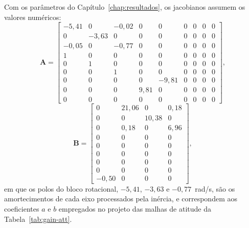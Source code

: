 {\color{blue}Com os parâmetros do Capítulo~\ref{chap:resultados}, os jacobianos assumem os valores numéricos:
\begin{equation}
    \mathbf{A} =
    \begin{bmatrix}
        -5{,}41 & 0 & -0{,}02 & 0 & 0 & 0 & 0 & 0 & 0 \\
        0 & -3{,}63 & 0 & 0 & 0 & 0 & 0 & 0 & 0 \\
        -0{,}05 & 0 & -0{,}77 & 0 & 0 & 0 & 0 & 0 & 0 \\
        1 & 0 & 0 & 0 & 0 & 0 & 0 & 0 & 0 \\
        0 & 1 & 0 & 0 & 0 & 0 & 0 & 0 & 0 \\
        0 & 0 & 1 & 0 & 0 & 0 & 0 & 0 & 0 \\
        0 & 0 & 0 & 0 & -9{,}81 & 0 & 0 & 0 & 0 \\
        0 & 0 & 0 & 9{,}81 & 0 & 0 & 0 & 0 & 0 \\
        0 & 0 & 0 & 0 & 0 & 0 & 0 & 0 & 0
    \end{bmatrix},
    \label{eq:matrix-A-num}
\end{equation}
\begin{equation}
    \mathbf{B} =
    \begin{bmatrix}
        0 & 21{,}06 & 0 & 0{,}18 \\
        0 & 0 & 10{,}38 & 0 \\
        0 & 0{,}18 & 0 & 6{,}96 \\
        0 & 0 & 0 & 0 \\
        0 & 0 & 0 & 0 \\
        0 & 0 & 0 & 0 \\
        0 & 0 & 0 & 0 \\
        0 & 0 & 0 & 0 \\
        -0{,}50 & 0 & 0 & 0
    \end{bmatrix},
    \label{eq:matrix-B-num}
\end{equation}
em que os polos do bloco rotacional, $-5{,}41$, $-3{,}63$ e $-0{,}77$~rad/s, são os amortecimentos de cada eixo processados pela inércia, e correspondem aos coeficientes $a$ e $b$ empregados no projeto das malhas de atitude da Tabela~\ref{tab:gain-att}.}
